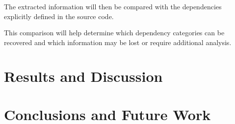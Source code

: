 \documentclass[conference]{IEEEtran}
\begin{document}
	The extracted information will then
	be compared with the dependencies
	explicitly defined in the source code.
	
	This comparison will help determine
	which dependency categories can be
	recovered and which information may
	be lost or require additional analysis.
	
	
	\section{Results and Discussion}
	
	
	
	\section{Conclusions and Future Work}
	
	
\end{document}
